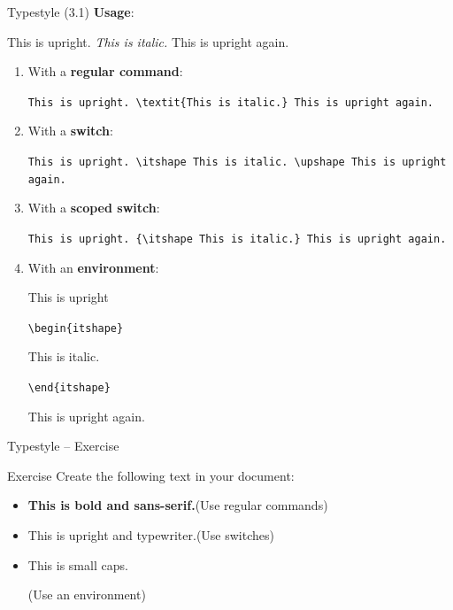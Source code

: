 \documentclass{beamer}
\newcommand{\switch}[1]{\texttt{\textbackslash#1}}
\newcommand{\command}[2]{\texttt{\textbackslash#1\{#2\}}}
\begin{document}
\begin{frame}{Typestyle (3.1)}
    \textbf{Usage}:

    \begin{center}
        This is upright. \textit{This is italic.} This is upright again.
    \end{center}

    \begin{enumerate}
        \item<only@1> With a \textbf{regular command}:

            \small\bigskip

            \texttt{This is upright. \command{textit}{This is italic.} This is upright again.}

        \item<only@2> With a \textbf{switch}:

            \small\bigskip

            \texttt{This is upright. \switch{itshape} This is italic. \switch{upshape} This is upright again.}

        \item<only@3> With a \textbf{scoped switch}:

            \small\bigskip

            \texttt{This is upright. \{\switch{itshape} This is italic.\} This is upright again.}

        \item<only@4> With an \textbf{environment}:

            \small\bigskip

            \begin{ttfamily}
                This is upright

                \command{begin}{itshape}

                \quad This is italic.

                \command{end}{itshape}

                This is upright again.
            \end{ttfamily}
    \end{enumerate}

\end{frame}

\begin{frame}{Typestyle -- Exercise}
    \begin{block}{Exercise}
        Create the following text in your document:

        \begin{itemize}
            \item \textbf{This is bold and sans-serif.}\hfill(Use regular commands)
            \item {\ttfamily This is upright and typewriter.}\hfill(Use switches)
            \item \begin{scshape}\rmfamily{}This is small caps.\end{scshape}\hfill(Use an environment)
        \end{itemize}
    \end{block}
\end{frame}
\end{document}
